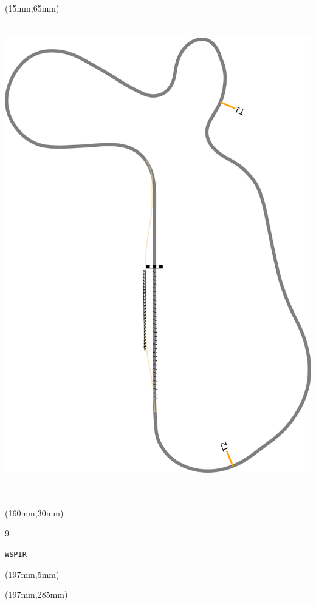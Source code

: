 \begin{textblock*}{185mm}(15mm,65mm)%
\centering
\mbox{\includegraphics[width=185mm,height=210mm,keepaspectratio]{PT/WSPIR.pdf}}
\end{textblock*}
\begin{textblock*}{40mm}(160mm,30mm)%
\Large
\par{} 
\par9 
\par\hfill\tiny\tt WSPIR\\
\end{textblock*}
\begin{textblock*}{20mm}(197mm,5mm)%
\fbox{\thepage}
\label{WSPIR}
\end{textblock*}
\begin{textblock*}{20mm}(197mm,285mm)%
\fbox{\thepage}
\end{textblock*}


